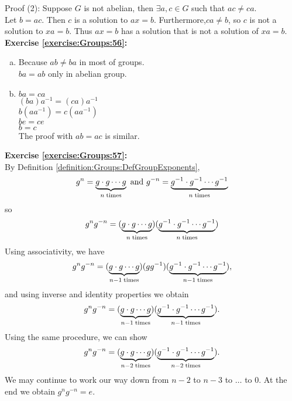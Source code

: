 \noindent Proof (2):
Suppose $G$ is not abelian, then $\exists a, c \in G$ such that $ac \neq ca$.\\
Let $b = ac$.  Then $c$ is a solution to $ax=b$. Furthermore,$ca \neq b$, so $c$ is not a solution to $xa = b$. Thus $ax=b$ has a solution that is not a solution of $xa=b$. 
\\

\noindent\textbf{Exercise \ref{exercise:Groups:56}:}
\begin{enumerate}[(a)]
\item
Because $ab\neq ba$ in most of groups.\\
$ba=ab$ only in abelian group.

\item
$ba=ca$ \quad \quad [Given]\\
$(ba)a^{-1}=(ca)a^{-1}$ \quad \quad [Substitution] \\
$b(aa^{-1})=c(aa^{-1})$ \quad \quad [Associative] \\
$be=ce$ \quad \quad \quad [Inverse]\\
$b=c$ \quad \quad \quad [Identity]\\
The proof with $ab=ac$ is similar.
\end{enumerate}

\noindent\textbf{Exercise \ref{exercise:Groups:57}:}
\\
By Definition \ref{definition:Groups:DefGroupExponents},
\[
g^n =  \underbrace{g \cdot g \cdots g}_{n \; {\rm times}}
\  \text{and}\  
g^{-n} =  \underbrace{g^{-1} \cdot g^{-1} \cdots g^{-1}}_{n \; {\rm times}}
\]
so
\[ g^n g^{-n} = (\underbrace{g \cdot g \cdots g}_{n \; {\rm times}}) (\underbrace{g^{-1} \cdot g^{-1} \cdots g^{-1}}_{n \; {\rm times}})\]
Using associativity, we have
\[ g^n g^{-n} = (\underbrace{g \cdot g \cdots g}_{n-1 \; {\rm times}})(gg^{-1}) (\underbrace{g^{-1} \cdot g^{-1} \cdots g^{-1}}_{n-1 \; {\rm times}}),\]
and using inverse and identity properties we obtain
\[ g^n g^{-n} = (\underbrace{g \cdot g \cdots g}_{n-1 \; {\rm times}}) (\underbrace{g^{-1} \cdot g^{-1} \cdots g^{-1}}_{n-1 \; {\rm times}}).\]
Using the same procedure, we can show
\[ g^n g^{-n} = (\underbrace{g \cdot g \cdots g}_{n-2 \; {\rm times}}) (\underbrace{g^{-1} \cdot g^{-1} \cdots g^{-1}}_{n-2 \; {\rm times}}).\]
We may continue to work our way down from $n-2$ to $n-3$ to $\ldots$ to 0.  At the end we obtain $g^n g^{-n} = e$.  \\

